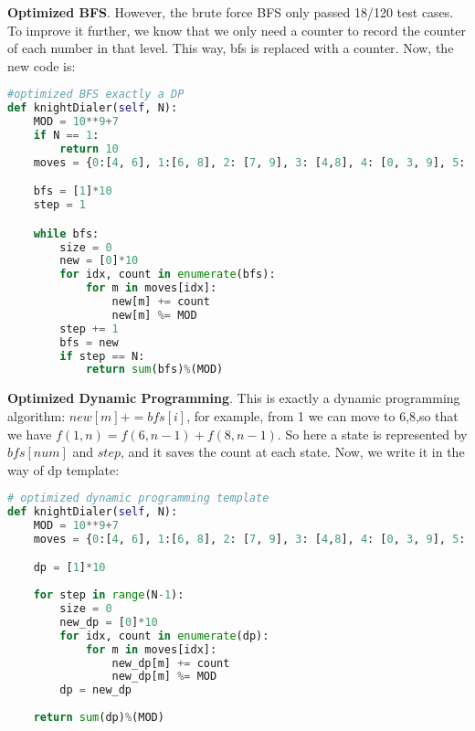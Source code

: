 \documentclass[../main.tex]{subfiles}
\begin{document}
\textbf{Optimized BFS}. However, the brute force BFS only passed 18/120 test cases. To improve it further, we know that we only need a counter to record the counter of each number in that level. This way, bfs is replaced with a counter. Now, the new code is:
\begin{lstlisting}[language = Python]
#optimized BFS exactly a DP
def knightDialer(self, N):
    MOD = 10**9+7
    if N == 1:
        return 10
    moves = {0:[4, 6], 1:[6, 8], 2: [7, 9], 3: [4,8], 4: [0, 3, 9], 5:[], 6:[0,1,7], 7:[2,6], 8:[1,3],9:[2,4]} #4, 6 has three

    bfs = [1]*10
    step = 1

    while bfs:
        size = 0
        new = [0]*10
        for idx, count in enumerate(bfs): 
            for m in moves[idx]:
                new[m] += count
                new[m] %= MOD
        step += 1
        bfs = new
        if step == N:
            return sum(bfs)%(MOD)
\end{lstlisting}
\textbf{Optimized Dynamic Programming}. This is exactly a dynamic programming algorithm: $new[m] += bfs[i]$, for example, from 1 we can move to 6,8,so that we have $f(1,n) = f(6, n-1) + f(8, n-1)$. So here a state is represented by $bfs[num]$ and $step$, and it saves the count at each state. Now, we write it in the way of dp template:
\begin{lstlisting}[language=Python]
# optimized dynamic programming template
def knightDialer(self, N):
    MOD = 10**9+7
    moves = {0:[4, 6], 1:[6, 8], 2: [7, 9], 3: [4,8], 4: [0, 3, 9], 5:[], 6:[0,1,7], 7:[2,6], 8:[1,3],9:[2,4]} #4, 6 has three

    dp = [1]*10
    
    for step in range(N-1):
        size = 0
        new_dp = [0]*10
        for idx, count in enumerate(dp): 
            for m in moves[idx]:
                new_dp[m] += count
                new_dp[m] %= MOD
        dp = new_dp
   
    return sum(dp)%(MOD)
\end{lstlisting}

\end{document}
